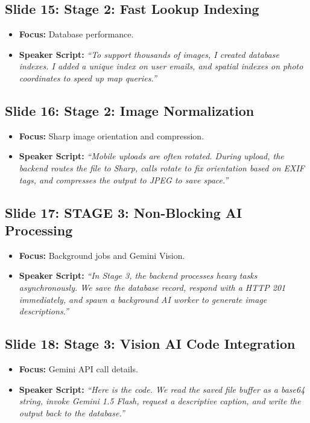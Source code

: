 \documentclass[11pt]{article}
\begin{document}
\subsection{Slide 15: Stage 2: Fast Lookup Indexing}
\begin{itemize}
    \item \textbf{Focus:} Database performance.
    \item \textbf{Speaker Script:} 
    \textit{``To support thousands of images, I created database indexes. I added a unique index on user emails, and spatial indexes on photo coordinates to speed up map queries.''}
\end{itemize}

\subsection{Slide 16: Stage 2: Image Normalization}
\begin{itemize}
    \item \textbf{Focus:} Sharp image orientation and compression.
    \item \textbf{Speaker Script:} 
    \textit{``Mobile uploads are often rotated. During upload, the backend routes the file to Sharp, calls rotate to fix orientation based on EXIF tags, and compresses the output to JPEG to save space.''}
\end{itemize}

\subsection{Slide 17: STAGE 3: Non-Blocking AI Processing}
\begin{itemize}
    \item \textbf{Focus:} Background jobs and Gemini Vision.
    \item \textbf{Speaker Script:} 
    \textit{``In Stage 3, the backend processes heavy tasks asynchronously. We save the database record, respond with a HTTP 201 immediately, and spawn a background AI worker to generate image descriptions.''}
\end{itemize}

\subsection{Slide 18: Stage 3: Vision AI Code Integration}
\begin{itemize}
    \item \textbf{Focus:} Gemini API call details.
    \item \textbf{Speaker Script:} 
    \textit{``Here is the code. We read the saved file buffer as a base64 string, invoke Gemini 1.5 Flash, request a descriptive caption, and write the output back to the database.''}
\end{itemize}
\end{document}
